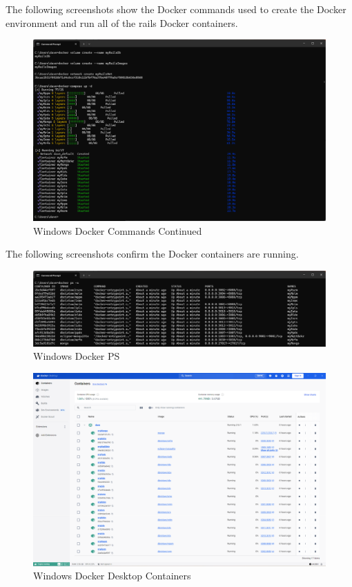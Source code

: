 The following screenshots show the Docker commands used to create the Docker environment and run all of the \gls{rails} Docker containers.
\begin{figure}[H]
    \centering
    \includegraphics[scale=0.4]{win2.png}
    \caption{Windows Docker Commands Continued}
    \label{fig:docker-cmds} 
\end{figure}
The following screenshots confirm the Docker containers are running.
\begin{figure}[H]
    \centering
    \includegraphics[scale=0.4]{win3.png}
    \caption{Windows Docker PS}
    \label{fig:docker-cmds-2}
\end{figure}
\begin{figure}[H]
    \centering
    \includegraphics[scale=0.33]{dd-containers.png}
    \caption{Windows Docker Desktop Containers}
    \label{fig:docker-cmds-2}
\end{figure}
